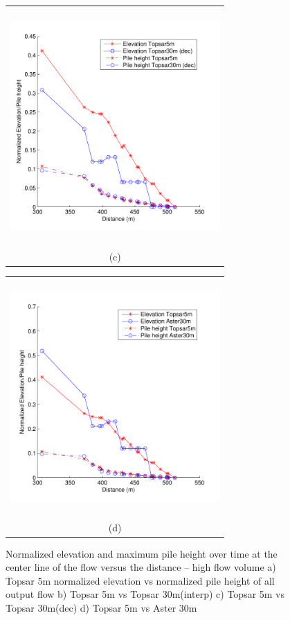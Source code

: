 \documentclass[12pt,letterpaper]{article}
\begin{document}
\begin{figure}[H]
\begin{minipage}[b]{0.5\textwidth}
    \begin{tabular}{c}
      \includegraphics[width=8cm,height=9cm,keepaspectratio]{plots/high_T5_T30_3.pdf}\\
      (c)
    \end{tabular}
  \end{minipage}
  \begin{minipage}{0.5\textwidth}
    \begin{tabular}{c}
      \includegraphics[width=8cm,height=9cm,keepaspectratio]{plots/high_T5_A30.pdf}\\
      (d)
    \end{tabular}
  \end{minipage}
   \caption{Normalized elevation and maximum pile height over time at the center line of the flow versus the distance -- high flow volume a) Topsar 5m normalized elevation vs normalized pile height of all output flow b) Topsar 5m vs Topsar 30m(interp) c) Topsar 5m vs Topsar 30m(dec) d) Topsar 5m vs Aster 30m }\label{fig12}
\end{figure}
\end{document}
